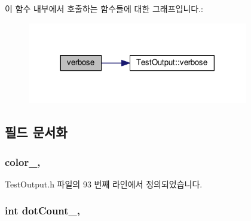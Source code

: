 이 함수 내부에서 호출하는 함수들에 대한 그래프입니다.\+:
\nopagebreak
\begin{figure}[H]
\begin{center}
\leavevmode
\includegraphics[width=273pt]{class_composite_test_output_a2ae0a8d48809abb33b5ba47c56fdc3ad_cgraph}
\end{center}
\end{figure}




\subsection{필드 문서화}
\subsubsection[{\texorpdfstring{color\+\_\+}{color_}}]{ color\+\_\+\hspace{0.3cm}{\ttfamily [protected]}, {\ttfamily [inherited]}}\hypertarget{class_test_output_adda8c1875964c3b80ed1c77b585fc756}{}\label{class_test_output_adda8c1875964c3b80ed1c77b585fc756}


Test\+Output.\+h 파일의 93 번째 라인에서 정의되었습니다.

\subsubsection[{\texorpdfstring{dot\+Count\+\_\+}{dotCount_}}]{\setlength{\rightskip}{0pt plus 5cm}int dot\+Count\+\_\+\hspace{0.3cm}{\ttfamily [protected]}, {\ttfamily [inherited]}}\hypertarget{class_test_output_a3c1c7e8cf0310d384198f0dc504251c6}{}\label{class_test_output_a3c1c7e8cf0310d384198f0dc504251c6}


